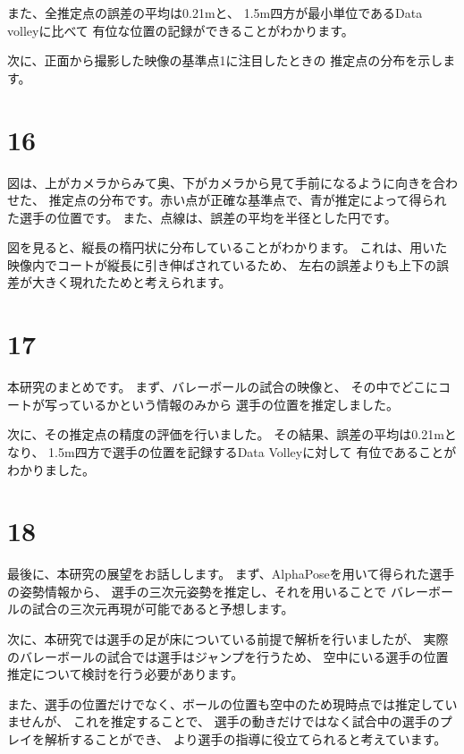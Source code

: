 \documentclass[]{jsarticle}
\begin{document}
    また、全推定点の誤差の平均は0.21mと、
    1.5m四方が最小単位であるData volleyに比べて
    有位な位置の記録ができることがわかります。

    次に、正面から撮影した映像の基準点1に注目したときの
    推定点の分布を示します。
\section*{16}
    図は、上がカメラからみて奥、下がカメラから見て手前になるように向きを合わせた、
    推定点の分布です。赤い点が正確な基準点で、青が推定によって得られた選手の位置です。
    また、点線は、誤差の平均を半径とした円です。

    図を見ると、縦長の楕円状に分布していることがわかります。
    これは、用いた映像内でコートが縦長に引き伸ばされているため、
    左右の誤差よりも上下の誤差が大きく現れたためと考えられます。
\section*{17}
    本研究のまとめです。
    まず、バレーボールの試合の映像と、
    その中でどこにコートが写っているかという情報のみから
    選手の位置を推定しました。

    次に、その推定点の精度の評価を行いました。
    その結果、誤差の平均は0.21mとなり、
    1.5m四方で選手の位置を記録するData Volleyに対して
    有位であることがわかりました。
\section*{18}
    最後に、本研究の展望をお話しします。
    まず、AlphaPoseを用いて得られた選手の姿勢情報から、
    選手の三次元姿勢を推定し、それを用いることで
    バレーボールの試合の三次元再現が可能であると予想します。

    次に、本研究では選手の足が床についている前提で解析を行いましたが、
    実際のバレーボールの試合では選手はジャンプを行うため、
    空中にいる選手の位置推定について検討を行う必要があります。

    また、選手の位置だけでなく、ボールの位置も空中のため現時点では推定していませんが、
    これを推定することで、
    選手の動きだけではなく試合中の選手のプレイを解析することができ、
    より選手の指導に役立てられると考えています。
\end{document}
